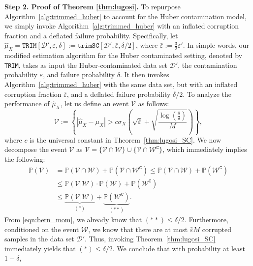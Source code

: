 \documentclass{article}
\newcommand{\mc}{\mathcal}
\begin{document}
\textbf{Step 2. Proof of Theorem \ref{thm:lugosi}.} To repurpose Algorithm~\ref{alg:trimmed_huber} to account for the Huber contamination model, we simply invoke Algorithm~\ref{alg:trimmed_huber} with an inflated corruption fraction and a deflated failure probability. Specifically, let $\hat{\mu}_X = \texttt{TRIM}[\mc{D}', \varepsilon, \delta] := \texttt{trimSC}[\mc{D}', \bar\varepsilon, \delta/2]$, where $\bar{\varepsilon} := \frac{3}{2} \varepsilon'$.  In simple words, our modified estimation algorithm for the Huber contaminated setting, denoted by \texttt{TRIM}, takes as input the Huber-contaminated data set $\mc{D}'$, the contamination probability $\varepsilon$, and failure probability $\delta$. It then invokes Algorithm~\ref{alg:trimmed_huber} with the same data set, but with an inflated corruption fraction $\bar{\varepsilon}$, and a deflated failure probability $\delta/2$. To analyze the performance of $\hat{\mu}_X$, let us define an event $\mc{V}$ as follows: 
\begin{equation} \label{eqn:good-event-trim}
    \mc{V} := \left\{ \left| \hat{\mu}_X - \mu_X \right| > c \sigma_X \left( \sqrt{\bar{\varepsilon}} + \sqrt{ \frac{\log\left( \frac{8}{\delta} \right)}{M} } \right) \right\},
\end{equation}
where $c$ is the universal constant in Theorem~\ref{thm:lugosi_SC}. We now  decompose the event \(\mc{V}\) as \(\mc{V} = \{\mc{V} \cap \mc{W}\} \cup \{\mc{V} \cap \mc{W}^{\texttt{C}}\}\), which immediately implies the following:
\begin{equation}\label{eqn:event_V}
\begin{aligned}
    \mathbb{P}(\mc{V}) 
    &= \mathbb{P}(\mc{V} \cap \mc{W}) + \mathbb{P}(\mc{V} \cap \mc{W}^{\texttt{C}}) \le \mathbb{P}(\mc{V} \cap \mc{W}) + \mathbb{P}(\mc{W}^{\texttt{C}}) \\
    &\le \mathbb{P}(\mc{V} \lvert \mc{W}) \cdot \mathbb{P}(\mc{W}) + \mathbb{P}(\mc{W}^{\texttt{C}}) \\
    &\le \underbrace{\mathbb{P}(\mc{V} \lvert \mc{W})}_{(*)} + \underbrace{\mathbb{P}(\mc{W}^{\texttt{C}})}_{(**)}.
\end{aligned}
\end{equation}
From \eqref{eqn:bern_mom}, we already know that \((**) \leq \delta/2 \). Furthermore, conditioned on the event $\mc{W}$, we know that there are at most $\bar{\varepsilon} M$ corrupted samples in the data set $\mc{D}'$. Thus, invoking Theorem~\ref{thm:lugosi_SC} immediately yields that  \((*) \leq \delta/2 \). We conclude that with probability at least \(1 - \delta\), 
\end{document}
